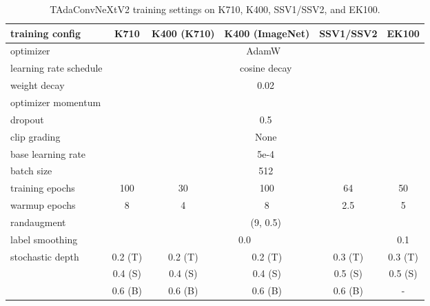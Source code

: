 \documentclass[10pt,journal,compsoc]{IEEEtran}
\newcommand{\tablestyle}[2]{\setlength{\tabcolsep}{#1}\renewcommand{\arraystretch}{#2}\centering\small}
\begin{document}
\begin{table*}[t]
    \centering
    \tablestyle{10pt}{1.0}
    \begin{tabular}{l|ccccc}
         \toprule
         training config & K710 & K400 (K710) & K400 (ImageNet) & {SSV1/SSV2} & EK100\\
         \midrule
         optimizer & \multicolumn{5}{c}{AdamW~\cite{adamw}} \\
         learning rate schedule & \multicolumn{5}{c}{cosine decay} \\
         weight decay & \multicolumn{5}{c}{0.02} \\
         optimizer momentum & \multicolumn{5}{c}{} \\
         dropout~\cite{dropout} & \multicolumn{5}{c}{0.5} \\
         clip grading & \multicolumn{5}{c}{None} \\
         \midrule
         base learning rate & \multicolumn{5}{c}{5e-4}\\
         batch size & \multicolumn{5}{c}{512} \\
         training epochs & 100 & 30 & 100 & 64 & 50\\
         warmup epochs & 8 & 4 & 8 & 2.5 & 5\\
         randaugment~\cite{randaugment} & \multicolumn{5}{c}{(9, 0.5)}\\
         label smoothing~\cite{szegedy2016inceptionv3} & \multicolumn{4}{c}{0.0} & 0.1 \\
         \multirow{3}{*}{stochastic depth} & 0.2 (T) & 0.2 (T) & 0.2 (T) & 0.3 (T) & 0.3 (T)\\
         ~ & 0.4 (S) & 0.4 (S) & 0.4 (S) & 0.5 (S) & 0.5 (S)\\
         ~ & 0.6 (B) & 0.6 (B) & 0.6 (B) & 0.6 (B) & -\\
         \bottomrule
    \end{tabular}
    \caption{TAdaConvNeXtV2 training settings on K710, K400, SSV1/SSV2, and EK100.}
    \label{tab:training_tadaconvnextv2}
\end{table*}
\end{document}
